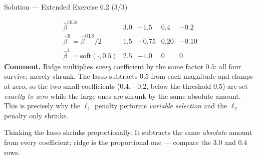 \documentclass[aspectratio=169,11pt]{beamer}
\begin{document}
\begin{frame}{Solution --- Extended Exercise 6.2 (3/3)}
  \begin{solutionbox}
    \[
      \begin{array}{c|cccc}
        \hat\beta^{\mathrm{OLS}} & 3.0 & -1.5 & 0.4 & -0.2\\\hline
        \hat\beta^{\mathrm R}=\hat\beta^{\mathrm{OLS}}/2 & 1.5 & -0.75 & 0.20 & -0.10\\[1pt]
        \hat\beta^{\mathrm L}=\mathrm{soft}(\cdot,0.5) & 2.5 & -1.0 & 0 & 0
      \end{array}
    \]
    \textbf{Comment.} Ridge multiplies \emph{every} coefficient by the
    same factor $0.5$: all four survive, merely shrunk. The lasso
    subtracts $0.5$ from each magnitude and clamps at zero, so the two
    small coefficients ($0.4,-0.2$, below the threshold $0.5$) are set
    \emph{exactly to zero} while the large ones are shrunk by the same
    absolute amount. This is precisely why the $\ell_1$ penalty performs
    \emph{variable selection} and the $\ell_2$ penalty only shrinks.
  \end{solutionbox}
  \begin{mistake}
    Thinking the lasso shrinks proportionally. It subtracts the same
    \emph{absolute} amount from every coefficient; ridge is the
    proportional one --- compare the $3.0$ and $0.4$ rows.
  \end{mistake}
\end{frame}
\end{document}
